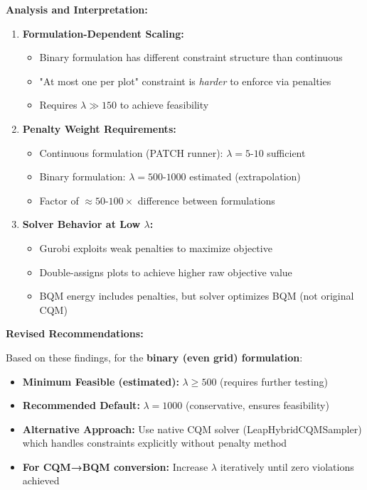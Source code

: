 \documentclass{oqireport}
\begin{document}
\textbf{Analysis and Interpretation:}

\begin{enumerate}
    \item \textbf{Formulation-Dependent Scaling:}
    \begin{itemize}
        \item Binary formulation has different constraint structure than continuous
        \item "At most one per plot" constraint is \textit{harder} to enforce via penalties
        \item Requires $\lambda \gg 150$ to achieve feasibility
    \end{itemize}
    
    \item \textbf{Penalty Weight Requirements:}
    \begin{itemize}
        \item Continuous formulation (PATCH runner): $\lambda = 5$-$10$ sufficient
        \item Binary formulation: $\lambda = 500$-$1000$ estimated (extrapolation)
        \item Factor of $\approx 50$-$100\times$ difference between formulations
    \end{itemize}
    
    \item \textbf{Solver Behavior at Low $\lambda$:}
    \begin{itemize}
        \item Gurobi exploits weak penalties to maximize objective
        \item Double-assigns plots to achieve higher raw objective value
        \item BQM energy includes penalties, but solver optimizes BQM (not original CQM)
    \end{itemize}
\end{enumerate}

\textbf{Revised Recommendations:}

Based on these findings, for the \textbf{binary (even grid) formulation}:

\begin{itemize}
    \item \textbf{Minimum Feasible (estimated):} $\lambda \geq 500$ (requires further testing)
    \item \textbf{Recommended Default:} $\lambda = 1000$ (conservative, ensures feasibility)
    \item \textbf{Alternative Approach:} Use native CQM solver (LeapHybridCQMSampler) which handles constraints explicitly without penalty method
    \item \textbf{For CQM→BQM conversion:} Increase $\lambda$ iteratively until zero violations achieved
\end{itemize}
\end{document}

